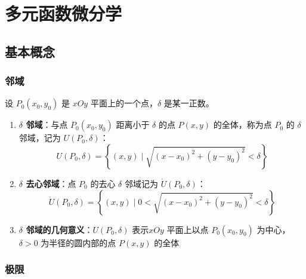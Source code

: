 \documentclass[../book.tex]{subfiles}
\begin{document}
    \section{多元函数微分学}

    \subsection{基本概念}

    \subsubsection{邻域}

    设 $P_0(x_0, y_0)$ 是 $xOy$ 平面上的一个点，$\delta$ 是某一正数。

    \begin{enumerate}
        \item \textbf{$\delta$ 邻域}：与点 $P_0(x_0, y_0)$ 距离小于 $\delta$ 的点 $P(x,y)$ 的全体，称为点 $P_0$ 的 $\delta$ 邻域，记为 $U(P_0, \delta)$：
        \[
            U(P_0, \delta) = \left\{ (x,y) \mid \sqrt{(x-x_0)^2 + (y-y_0)^2} < \delta \right\}
        \]

        \item \textbf{$\delta$ 去心邻域}：点 $P_0$ 的去心 $\delta$ 邻域记为 $\mathring{U}(P_0, \delta)$：
        \[
            \mathring{U}(P_0, \delta) = \left\{ (x,y) \mid 0 < \sqrt{(x-x_0)^2 + (y-y_0)^2} < \delta \right\}
        \]

        \item \textbf{$\delta$ 邻域的几何意义}：$U(P_0, \delta)$ 表示$xOy$ 平面上以点 $P_0(x_0, y_0)$ 为中心，$\delta > 0$ 为半径的圆内部的点 $P(x,y)$ 的全体
    \end{enumerate}

    \subsubsection{极限}
\end{document}
